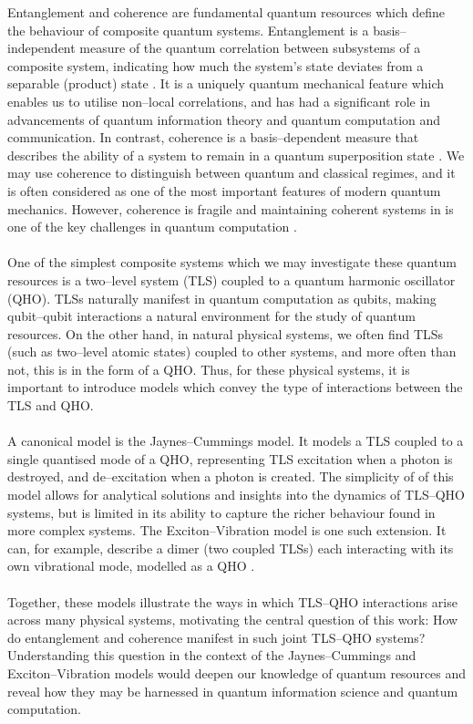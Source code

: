 \documentclass[12pt]{article}
\begin{document}
Entanglement and coherence are fundamental quantum resources which define the behaviour of composite quantum systems. Entanglement is a basis--independent measure of the quantum correlation between subsystems of a
composite system, indicating how much the system’s state deviates from a separable (product) state \cite{Entanglement2009-Definition}. It is a uniquely quantum mechanical feature which enables us to utilise non--local correlations, and has had a significant role in advancements of quantum information theory and quantum computation and communication. In contrast, coherence is a basis--dependent measure that describes the ability of a system to remain in a quantum superposition state \cite{Coherence2017-Colloquium}. We may use coherence to distinguish between quantum and classical regimes, and it is often considered as one of the most important features of modern quantum mechanics. However, coherence is fragile and maintaining coherent systems in is one of the key challenges in quantum computation \cite{OQS2019_decoherence}. \\
\\
One of the simplest composite systems which we may investigate these quantum resources is a two--level system (TLS) coupled to a quantum harmonic oscillator (QHO). TLSs naturally manifest in quantum computation as qubits, making qubit–qubit interactions a natural environment for the study of quantum resources. On the other hand, in natural physical systems, we often find TLSs (such as two--level atomic states) coupled to other systems, and more often than not, this is in the form of a QHO. Thus, for these physical systems, it is important to introduce models which convey the type of interactions between the TLS and QHO.\\
\\
A canonical model is the Jaynes--Cummings model. It models a TLS coupled to a single quantised mode of a QHO, representing TLS excitation when a photon is destroyed, and de--excitation when a photon is created. The simplicity of of this model allows for analytical solutions and insights into the dynamics of TLS--QHO systems, but is limited in its ability to capture the richer behaviour found in more complex systems. The Exciton–Vibration model is one such extension. It can, for example, describe a dimer (two coupled TLSs) each interacting with its own vibrational mode, modelled as a QHO \cite{ExVib2014-Alexandra}.\\
\\
Together, these models illustrate the ways in which TLS–QHO interactions arise across many physical systems, motivating the central question of this work: How do entanglement and coherence manifest in such joint TLS--QHO systems? Understanding this question in the context of the Jaynes--Cummings and Exciton--Vibration models would deepen our knowledge of quantum resources and reveal how they may be harnessed in quantum information science and quantum computation. \\
\end{document}

